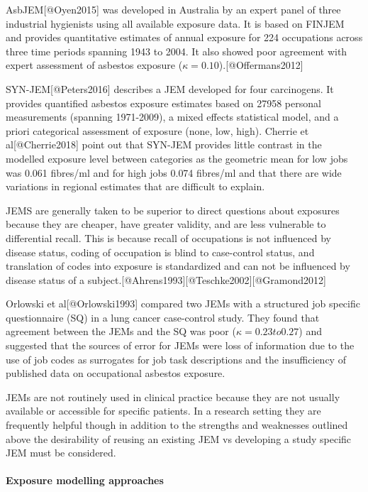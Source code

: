 \documentclass[
]{article}
\begin{document}
AsbJEM{[}@Oyen2015{]} was developed in Australia by an expert panel of
three industrial hygienists using all available exposure data. It is
based on FINJEM and provides quantitative estimates of annual exposure
for 224 occupations across three time periods spanning 1943 to 2004. It
also showed poor agreement with expert assessment of asbestos exposure
(\ensuremath{\kappa = 0.10}).{[}@Offermans2012{]}

SYN-JEM{[}@Peters2016{]} describes a JEM developed for four carcinogens.
It provides quantified asbestos exposure estimates based on 27958
personal measurements (spanning 1971-2009), a mixed effects statistical
model, and a priori categorical assessment of exposure (none, low,
high). Cherrie et al{[}@Cherrie2018{]} point out that SYN-JEM provides
little contrast in the modelled exposure level between categories as the
geometric mean for low jobs was 0.061 fibres/ml and for high jobs 0.074
fibres/ml and that there are wide variations in regional estimates that
are difficult to explain.

JEMS are generally taken to be superior to direct questions about
exposures because they are cheaper, have greater validity, and are less
vulnerable to differential recall. This is because recall of occupations
is not influenced by disease status, coding of occupation is blind to
case-control status, and translation of codes into exposure is
standardized and can not be influenced by disease status of a
subject.{[}@Ahrens1993{]}{[}@Teschke2002{]}{[}@Gramond2012{]}

Orlowski et al{[}@Orlowski1993{]} compared two JEMs with a structured
job specific questionnaire (SQ) in a lung cancer case-control study.
They found that agreement between the JEMs and the SQ was poor
(\ensuremath{\kappa = 0.23 to 0.27}) and suggested that the sources of
error for JEMs were loss of information due to the use of job codes as
surrogates for job task descriptions and the insufficiency of published
data on occupational asbestos exposure.

JEMs are not routinely used in clinical practice because they are not
usually available or accessible for specific patients. In a research
setting they are frequently helpful though in addition to the strengths
and weaknesses outlined above the desirability of reusing an existing
JEM vs developing a study specific JEM must be considered.

\hypertarget{exposure-modelling-approaches}{%
\paragraph{Exposure modelling
approaches}\label{exposure-modelling-approaches}}
\end{document}
